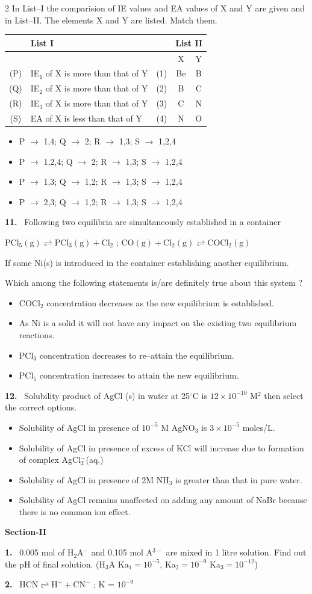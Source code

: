 \documentclass[10pt]{extarticle}
\newcommand{\sect}[1]{\par\smallskip\noindent\textbf{#1}\par}
\newcommand{\qn}[1]{\par\smallskip\noindent\textbf{#1.}~}
\newenvironment{qoptions}{\begin{itemize}[leftmargin=1.8em,itemsep=1pt,topsep=2pt,label={}]}{\end{itemize}}
\newcommand{\opt}[2]{\item[(#1)] #2}
\begin{document}
\begin{multicols}{2}
In List--I the comparision of IE values and EA values of X and Y are given and in List--II. The elements X and Y are listed. Match them.
\begin{center}\small\setlength{\tabcolsep}{3pt}
\begin{tabular}{|c|p{3.6cm}|c|c|c|}
\hline
 & List I & & \multicolumn{2}{c|}{List II}\\ \hline
 & & & X & Y\\ \hline
(P) & IE$_1$ of X is more than that of Y & (1) & Be & B\\ \hline
(Q) & IE$_2$ of X is more than that of Y & (2) & B & C\\ \hline
(R) & IE$_3$ of X is more than that of Y & (3) & C & N\\ \hline
(S) & EA of X is less than that of Y & (4) & N & O\\ \hline
\end{tabular}
\end{center}
\begin{qoptions}
\opt{A}{P $\to$ 1,4; Q $\to$ 2; R $\to$ 1,3; S $\to$ 1,2,4}
\opt{B}{P $\to$ 1,2,4; Q $\to$ 2; R $\to$ 1,3; S $\to$ 1,2,4}
\opt{C}{P $\to$ 1,3; Q $\to$ 1,2; R $\to$ 1,3; S $\to$ 1,2,4}
\opt{D}{P $\to$ 2,3; Q $\to$ 1,2; R $\to$ 1,3; S $\to$ 1,2,4}
\end{qoptions}
\qn{11} Following two equilibria are simultaneously established in a container

$\mathrm{PCl_5(g)\rightleftharpoons PCl_3(g)+Cl_2}$ ; $\mathrm{CO(g)+Cl_2(g)\rightleftharpoons COCl_2(g)}$

If some Ni(s) is introduced in the container establishing another equilibrium.

Which among the following statements is/are definitely true about this system ?
\begin{qoptions}
\opt{A}{COCl$_2$ concentration decreases as the new equilibrium is established.}
\opt{B}{As Ni is a solid it will not have any impact on the existing two equilibrium reactions.}
\opt{C}{PCl$_3$ concentration decreases to re--attain the equilibrium.}
\opt{D}{PCl$_5$ concentration increases to attain the new equilibrium.}
\end{qoptions}
\qn{12} Solubility product of AgCl (s) in water at 25$^\circ$C is $12\times10^{-10}$ M$^2$ then select the correct options.
\begin{qoptions}
\opt{A}{Solubility of AgCl in presence of $10^{-5}$ M AgNO$_3$ is $3\times10^{-5}$ moles/L.}
\opt{B}{Solubility of AgCl in presence of excess of KCl will increase due to formation of complex AgCl$_2^-$(aq.)}
\opt{C}{Solubility of AgCl in presence of 2M NH$_3$ is greater than that in pure water.}
\opt{D}{Solubility of AgCl remains unaffected on adding any amount of NaBr because there is no common ion effect.}
\end{qoptions}
\sect{Section-II}
\qn{1} 0.005 mol of H$_2$A$^-$ and 0.105 mol A$^{3-}$ are mixed in 1 litre solution. Find out the pH of final solution. (H$_3$A Ka$_1=10^{-5}$, Ka$_2=10^{-9}$ Ka$_3=10^{-12}$)
\qn{2} $\mathrm{HCN\rightleftharpoons H^++CN^-}$ \hfill ; K = $10^{-9}$


\end{multicols}
\end{document}
